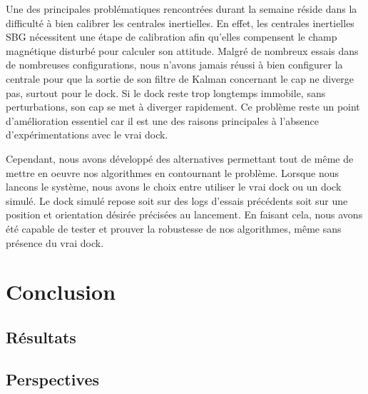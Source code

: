 \documentclass[12pt]{report}
\begin{document}
Une des principales problématiques rencontrées durant la semaine réside dans la difficulté à bien calibrer les centrales inertielles. En effet, les centrales inertielles SBG nécessitent une étape de calibration
afin qu'elles compensent le champ magnétique disturbé pour calculer son attitude. Malgré de nombreux essais dans de nombreuses configurations, nous n'avons jamais réussi à bien configurer la centrale 
pour que la sortie de son filtre de Kalman concernant le cap ne diverge pas, surtout pour le dock. Si le dock reste trop longtemps immobile, sans perturbations, son cap se met à diverger rapidement.
Ce problème reste un point d'amélioration essentiel car il est une des raisons principales à l'absence d'expérimentations avec le vrai dock. 

Cependant, nous avons développé des alternatives permettant tout de même de mettre en oeuvre nos algorithmes en contournant le problème. Lorsque nous lancons le système, nous avons le choix entre
utiliser le vrai dock ou un dock simulé. Le dock simulé repose soit sur des logs d'essais précédents soit sur une position et orientation désirée précisées au lancement. 
En faisant cela, nous avons été capable de tester et prouver la robustesse de nos algorithmes, même sans présence du vrai dock.



\chapter{Conclusion}
\section{Résultats}

\section{Perspectives}
   





\end{document}
